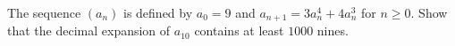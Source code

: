 The sequence $(a_n)$ is defined by $a_0 = 9$ and $a_{n+1} = 3a_n^4 + 4a_n^3$ for $n \geq 0$. Show that the decimal expansion of $a_{10}$ contains at least $1000$ nines.
